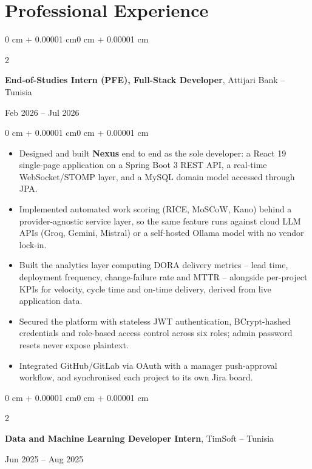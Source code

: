 \documentclass[10pt, letterpaper]{article}
\newenvironment{highlights}{
    \begin{itemize}[
        topsep=0.10 cm,
        parsep=0.10 cm,
        partopsep=0pt,
        itemsep=0pt,
        leftmargin=0 cm + 10pt
    ]
}{
    \end{itemize}
}
\newenvironment{onecolentry}{
    \begin{adjustwidth}{0 cm + 0.00001 cm}{0 cm + 0.00001 cm}
}{
    \end{adjustwidth}
}
\newenvironment{twocolentry}[2][]{
    \onecolentry
    \def\secondColumn{#2}
    \setcolumnwidth{\fill, 4.5 cm}
    \begin{paracol}{2}
}{
    \switchcolumn \raggedleft \secondColumn
    \end{paracol}
    \endonecolentry
}
\begin{document}
\section{Professional Experience}

\begin{twocolentry}{Feb 2026 -- Jul 2026}
    \textbf{End-of-Studies Intern (PFE), Full-Stack Developer}, Attijari Bank -- Tunisia
\end{twocolentry}

\vspace{0.10 cm}

\begin{onecolentry}
    \begin{highlights}
        \item Designed and built \textbf{Nexus} end to end as the sole developer: a React 19
              single-page application on a Spring Boot 3 REST API, a real-time WebSocket/STOMP
              layer, and a MySQL domain model accessed through JPA.
        \item Implemented automated work scoring (RICE, MoSCoW, Kano) behind a
              provider-agnostic service layer, so the same feature runs against cloud LLM APIs
              (Groq, Gemini, Mistral) or a self-hosted Ollama model with no vendor lock-in.
        \item Built the analytics layer computing DORA delivery metrics -- lead time,
              deployment frequency, change-failure rate and MTTR -- alongside per-project KPIs
              for velocity, cycle time and on-time delivery, derived from live application data.
        \item Secured the platform with stateless JWT authentication, BCrypt-hashed credentials
              and role-based access control across six roles; admin password resets never expose
              plaintext.
        \item Integrated GitHub/GitLab via OAuth with a manager push-approval workflow, and
              synchronised each project to its own Jira board.
    \end{highlights}
\end{onecolentry}

\vspace{0.2 cm}

\begin{twocolentry}{Jun 2025 -- Aug 2025}
    \textbf{Data and Machine Learning Developer Intern}, TimSoft -- Tunisia
\end{twocolentry}
\end{document}
